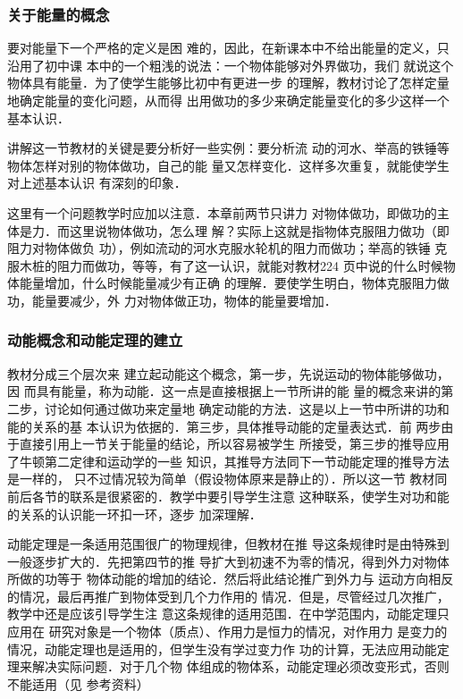 \subsubsection{关于能量的概念}

要对能量下一个严格的定义是困
难的，因此，在新课本中不给出能量的定义，只沿用了初中课
本中的一个粗浅的说法：一个物体能够对外界做功，我们
就说这个物体具有能量．为了使学生能够比初中有更进一步
的理解，教材讨论了怎样定量地确定能量的变化问题，从而得
出用做功的多少来确定能量变化的多少这样一个基本认识．

讲解这一节教材的关键是要分析好一些实例：要分析流
动的河水、举高的铁锤等物体怎样对别的物体做功，自己的能
量又怎样变化．这样多次重复，就能使学生对上述基本认识
有深刻的印象．

这里有一个问题教学时应加以注意．本章前两节只讲力
对物体做功，即做功的主体是力．而这里说物体做功，怎么理
解？实际上这就是指物体克服阻力做功（即阻力对物体做负
功），例如流动的河水克服水轮机的阻力而做功；举高的铁锤
克服木桩的阻力而做功，等等，有了这一认识，就能对教材224
页中说的什么时候物体能量增加，什么时候能量减少有正确
的理解．要使学生明白，物体克服阻力做功，能量要减少，外
力对物体做正功，物体的能量要增加．

\subsubsection{动能概念和动能定理的建立}

教材分成三个层次来
建立起动能这个概念，第一步，先说运动的物体能够做功，因
而具有能量，称为动能．这一点是直接根据上一节所讲的能
量的概念来讲的第二步，讨论如何通过做功来定量地
确定动能的方法．这是以上一节中所讲的功和能的关系的基
本认识为依据的．第三步，具体推导动能的定量表达式．前
两步由于直接引用上一节关于能量的结论，所以容易被学生
所接受，第三步的推导应用了牛顿第二定律和运动学的一些
知识，其推导方法同下一节动能定理的推导方法是一样的，
只不过情况较为简单（假设物体原来是静止的）．所以这一节
教材同前后各节的联系是很紧密的．教学中要引导学生注意
这种联系，使学生对功和能的关系的认识能一环扣一环，逐步
加深理解．

动能定理是一条适用范围很广的物理规律，但教材在推
导这条规律时是由特殊到一般逐步扩大的．先把第四节的推
导扩大到初速不为零的情况，得到外力对物体所做的功等于
物体动能的增加的结论．然后将此结论推广到外力与
运动方向相反的情况，最后再推广到物体受到几个力作用的
情况．但是，尽管经过几次推广，教学中还是应该引导学生注
意这条规律的适用范围．在中学范围内，动能定理只应用在
研究对象是一个物体（质点）、作用力是恒力的情况，对作用力
是变力的情况，动能定理也是适用的，但学生没有学过变力作
功的计算，无法应用动能定理来解决实际问题．对于几个物
体组成的物体系，动能定理必须改变形式，否则不能适用（见
参考资料）

